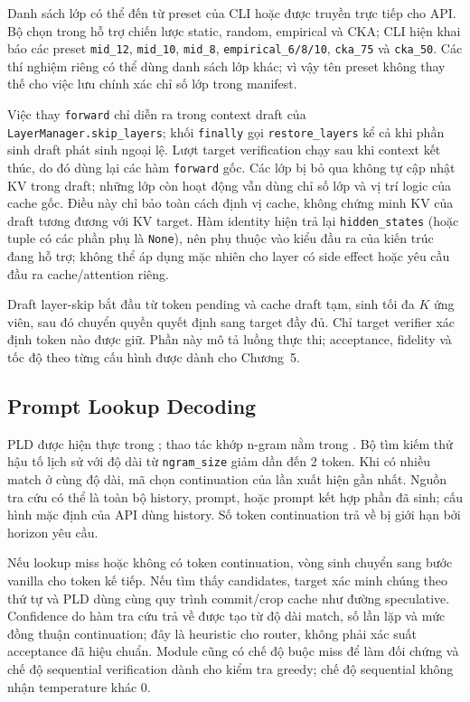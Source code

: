 Danh sách lớp có thể đến từ preset của CLI hoặc được truyền trực tiếp cho API. Bộ chọn trong  hỗ trợ chiến lược static, random, empirical và CKA; CLI hiện khai báo các preset \texttt{mid\_12}, \texttt{mid\_10}, \texttt{mid\_8}, \texttt{empirical\_6/8/10}, \texttt{cka\_75} và \texttt{cka\_50}. Các thí nghiệm riêng có thể dùng danh sách lớp khác; vì vậy tên preset không thay thế cho việc lưu chính xác chỉ số lớp trong manifest.

Việc thay \texttt{forward} chỉ diễn ra trong context draft của \texttt{LayerManager.skip\_layers}; khối \texttt{finally} gọi \texttt{restore\_layers} kể cả khi phần sinh draft phát sinh ngoại lệ. Lượt target verification chạy sau khi context kết thúc, do đó dùng lại các hàm \texttt{forward} gốc. Các lớp bị bỏ qua không tự cập nhật KV trong draft; những lớp còn hoạt động vẫn dùng chỉ số lớp và vị trí logic của cache gốc. Điều này chỉ bảo toàn cách định vị cache, không chứng minh KV của draft tương đương với KV target. Hàm identity hiện trả lại \texttt{hidden\_states} (hoặc tuple có các phần phụ là \texttt{None}), nên phụ thuộc vào kiểu đầu ra của kiến trúc đang hỗ trợ; không thể áp dụng mặc nhiên cho layer có side effect hoặc yêu cầu đầu ra cache/attention riêng.

Draft layer-skip bắt đầu từ token pending và cache draft tạm, sinh tối đa \(K\) ứng viên, sau đó chuyển quyền quyết định sang target đầy đủ. Chỉ target verifier xác định token nào được giữ. Phần này mô tả luồng thực thi; acceptance, fidelity và tốc độ theo từng cấu hình được dành cho Chương~5.

\subsection{Prompt Lookup Decoding}
PLD được hiện thực trong ; thao tác khớp n-gram nằm trong . Bộ tìm kiếm thử hậu tố lịch sử với độ dài từ \texttt{ngram\_size} giảm dần đến 2 token. Khi có nhiều match ở cùng độ dài, mã chọn continuation của lần xuất hiện gần nhất. Nguồn tra cứu có thể là toàn bộ history, prompt, hoặc prompt kết hợp phần đã sinh; cấu hình mặc định của API dùng history. Số token continuation trả về bị giới hạn bởi horizon yêu cầu.

Nếu lookup miss hoặc không có token continuation, vòng sinh chuyển sang bước vanilla cho token kế tiếp. Nếu tìm thấy candidates, target xác minh chúng theo thứ tự và PLD dùng cùng quy trình commit/crop cache như đường speculative. Confidence do hàm tra cứu trả về được tạo từ độ dài match, số lần lặp và mức đồng thuận continuation; đây là heuristic cho router, không phải xác suất acceptance đã hiệu chuẩn. Module cũng có chế độ buộc miss để làm đối chứng và chế độ sequential verification dành cho kiểm tra greedy; chế độ sequential không nhận temperature khác 0.

